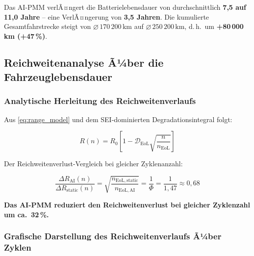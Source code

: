 ﻿\documentclass[12pt,a4paper]{article}
\begin{document}
	Das AI-PMM verlÃ¤ngert die Batterielebensdauer von durchschnittlich
	\textbf{7{,}5 auf 11{,}0 Jahre} -- eine VerlÃ¤ngerung von \textbf{3{,}5 Jahren}.
	Die kumulierte Gesamtfahrstrecke steigt von $\varnothing\,170\,200\,\mathrm{km}$
	auf $\varnothing\,250\,200\,\mathrm{km}$, d.\,h.\ um \textbf{+80\,000\,km (+47\,\%)}.
	
	\subsection{Reichweitenanalyse Ã¼ber die Fahrzeuglebensdauer}
	
	\subsubsection{Analytische Herleitung des Reichweitenverlaufs}
	
	Aus \eqref{eq:range_model} und dem SEI-dominierten Degradationsintegral
	folgt:
	
	\begin{equation}
		R(n) = R_0 \left[1 - \mathcal{D}_\mathrm{EoL}\sqrt{\frac{n}{n_\mathrm{EoL}}}\right]
		\label{eq:range_vs_cycles}
	\end{equation}
	
	Der Reichweitenverlust-Vergleich bei gleicher Zyklenanzahl:
	
	\begin{equation}
		\frac{\Delta R_\mathrm{AI}(n)}{\Delta R_\mathrm{static}(n)} =
		\sqrt{\frac{n_\mathrm{EoL,static}}{n_\mathrm{EoL,AI}}} =
		\frac{1}{\Phi} = \frac{1}{1{,}47} \approx 0{,}68
		\label{eq:range_loss_ratio}
	\end{equation}
	
	\textbf{Das AI-PMM reduziert den Reichweitenverlust bei gleicher Zyklenzahl
		um ca.\ 32\,\%.}
	
	\subsubsection{Grafische Darstellung des Reichweitenverlaufs Ã¼ber Zyklen}
	
\end{document}
